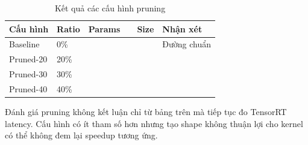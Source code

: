 \begin{table}[H]
\centering
\caption{Kết quả các cấu hình pruning}
\label{tab:pruning-results}
\begin{tabularx}{\textwidth}{L{3cm}C{2cm}C{2.2cm}C{2.2cm}C{2cm}Y}
\toprule
\textbf{Cấu hình} & \textbf{Ratio} & \textbf{Params} & \textbf{} &
\textbf{Size} & \textbf{Nhận xét}\\
\midrule
Baseline & 0\% & \cbs{} & \cbs{} & \cbs{} & Đường chuẩn\\
Pruned-20 & 20\% & \cbs{} & \cbs{} & \cbs{} & \cbs{}\\
Pruned-30 & 30\% & \cbs{} & \cbs{} & \cbs{} & \cbs{}\\
Pruned-40 & 40\% & \cbs{} & \cbs{} & \cbs{} & \cbs{}\\
\bottomrule
\end{tabularx}
\end{table}

Đánh giá pruning không kết luận chỉ từ bảng trên mà tiếp tục đo TensorRT latency.
Cấu hình có ít tham số hơn nhưng tạo shape không thuận lợi cho kernel có thể
không đem lại speedup tương ứng.